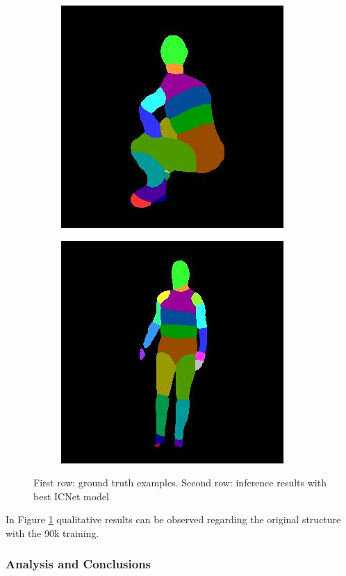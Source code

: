 \documentclass[12pt,a4paper]{article}
\begin{document}
\begin{figure}
\begin{subfigure}{.19\textwidth}
\end{subfigure}
\begin{subfigure}{.19\textwidth}
  \centering
  \includegraphics[scale=0.3]{19_12_c0006_29.jpg}
\end{subfigure}
\begin{subfigure}{.19\textwidth}
  \centering
  \includegraphics[scale=0.3]{ung_144_34_c0008_39.jpg}
\end{subfigure}

\caption{First row: ground truth examples. Second row: inference results with best ICNet model}
\label{icnet:inference}
\end{figure}



In Figure \ref{icnet:inference} qualitative results can be observed regarding the original structure with the 90k training.

\subsubsection{Analysis and Conclusions}
\end{document}
